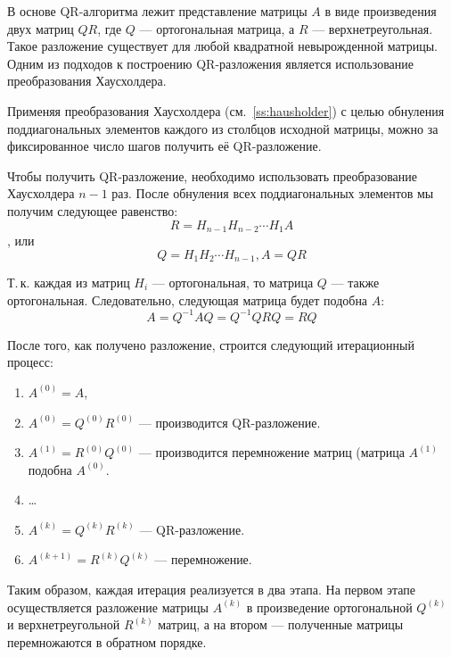 \documentclass[a4paper,12pt,notitlepage,pdftex,headsepline]{scrartcl}
\begin{document}
В основе QR-алгоритма лежит представление матрицы $A$ в виде произведения двух матриц $QR$, где $Q$ --- ортогональная матрица, а $R$ --- верхнетреугольная.
Такое разложение существует для любой квадратной невырожденной матрицы.
Одним из подходов к построению QR-разложения является использование преобразования Хаусхолдера.

Применяя преобразования Хаусхолдера (см.~\ref{ss:hausholder}) с целью обнуления поддиагональных элементов каждого из столбцов исходной матрицы, можно за фиксированное число шагов получить её QR-разложение.

Чтобы получить QR-разложение, необходимо использовать преобразование Хаусхолдера $n-1$ раз.
После обнуления всех поддиагональных элементов мы получим следующее равенство:
$$R = H_{n-1} H_{n-2}\cdots H_1 A$$,
или
$$Q = H_1 H_2 \cdots H_{n-1}, A = QR$$

Т.\,к. каждая из матриц $H_i$ --- ортогональная, то матрица $Q$ --- также ортогональная.
Следовательно, следующая матрица будет подобна $A$:
$$A = Q^{-1} A Q = Q^{-1} Q R Q = R Q$$

После того, как получено разложение, строится следующий итерационный процесс:
\begin{enumerate}
\item $A^{\left(0\right)} = A$,
\item $A^{\left(0\right)} = Q^{\left(0\right)}R^{\left(0\right)}$ --- производится QR-разложение.
\item $A^{\left(1\right)} = R^{\left(0\right)}Q^{\left(0\right)}$ --- производится перемножение матриц (матрица $A^{\left(1\right)}$ подобна $A^{\left(0\right)}$.
\item \dots
\item $A^{\left(k\right)} = Q^{\left(k\right)}R^{\left(k\right)}$ --- QR-разложение.
\item $A^{\left(k+1\right)} = R^{\left(k\right)}Q^{\left(k\right)}$ --- перемножение.
\end{enumerate}

Таким образом, каждая итерация реализуется в два этапа.
На первом этапе осуществляется разложение матрицы $A^{\left(k\right)}$ в произведение ортогональной $Q^{\left(k\right)}$ и верхнетреугольной $R^{\left(k\right)}$ матриц, а на втором --- полученные матрицы перемножаются в обратном порядке.
\end{document}
